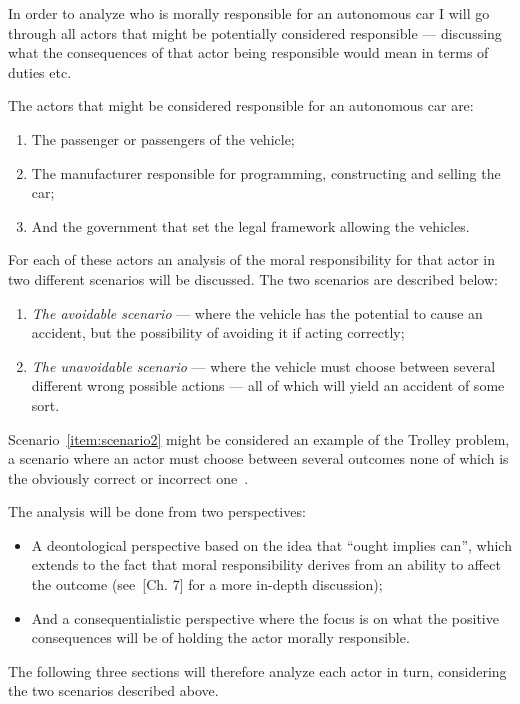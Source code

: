In order to analyze who is morally responsible for an autonomous car I will
go through all actors that might be potentially considered responsible ---
discussing what the consequences of that actor being responsible would mean in
terms of duties etc.

The actors that might be considered responsible for an autonomous car are:
\begin{enumerate}
\item The passenger or passengers of the vehicle;
\item The manufacturer responsible for programming, constructing and selling the car;
\item And the government that set the legal framework allowing the vehicles.
\end{enumerate}

For each of these actors an analysis of the moral responsibility for that actor
in two different scenarios will be discussed. The two scenarios are described below:
\begin{enumerate}
\item\label{item:scenario1} \textit{The avoidable scenario} --- where the vehicle has the
  potential to cause an accident, but the possibility of avoiding it if acting
  correctly;
\item\label{item:scenario2} \textit{The unavoidable scenario} --- where the
  vehicle must choose between several different wrong possible actions --- all
  of which will yield an accident of some sort.
\end{enumerate}

Scenario~\ref{item:scenario2} might be considered an example of the Trolley problem, a
scenario where an actor must choose between several outcomes none of which is the
obviously correct or incorrect one~\cite{2016_trolley_tp}.

The analysis will be done from two perspectives:
\begin{itemize}
\item A deontological perspective based on the idea that ``ought implies
  can'', which extends to the fact that moral responsibility derives from an
  ability to affect the outcome (see~\cite{stern_2015_kantian_kevaao}[Ch. 7]
  for a more in-depth discussion);
\item And a consequentialistic perspective where the focus is on what the
  positive consequences will be of holding the actor morally responsible.
\end{itemize}

The following three sections will therefore analyze each actor in turn,
considering the two scenarios described above.

